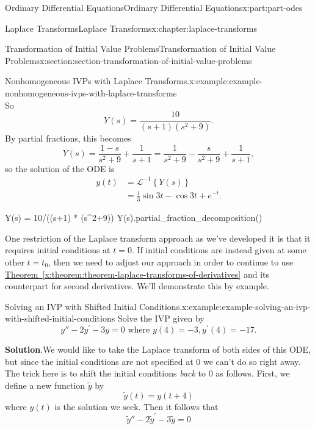 \documentclass[oneside,10pt,]{book}
\newcommand{\blocktitlefont}{\relax}
\newcommand{\xreffont}{\relax}
\numberwithin{equation}{part}
\newcommand{\iLaplace}[1]{\mathcal{L}^{-1}\left\{#1\right\}}
\newcommand{\amp}{&}
\begin{document}
\begin{partptx}{Ordinary Differential Equations}{}{Ordinary Differential Equations}{}{}{x:part:part-odes}
\begin{chapterptx}{Laplace Transforms}{}{Laplace Transforms}{}{}{x:chapter:laplace-transforms}
\begin{sectionptx}{Transformation of Initial Value Problems}{}{Transformation of Initial Value Problems}{}{}{x:section:section-transformation-of-initial-value-problems}
\begin{example}{Nonhomogeneous IVPs with Laplace Transforms.}{x:example:example-nonhomogeneous-ivps-with-laplace-transforms}
\begin{equation*}
\end{equation*}
So%
\begin{equation*}
Y(s) = \frac{10}{(s+1)(s^{2}+9)}.
\end{equation*}
By partial fractions, this becomes%
\begin{equation*}
Y(s) = \frac{1-s}{s^{2}+9} + \frac{1}{s+1} = \frac{1}{s^{2}+9} - \frac{s}{s^{2}+9} + \frac{1}{s+1},
\end{equation*}
so the solution of the ODE is%
\begin{align*}
y(t) \amp = \iLaplace{Y(s)}\\
\amp= \frac{1}{3}\sin3t -\cos3t + e^{-t}\text{.}
\end{align*}
%
\end{example}
\begin{sageinput}
Y(s) = 10/((s+1) * (s^2+9))
Y(s).partial_fraction_decomposition()
\end{sageinput}
One restriction of the Laplace transform approach as we've developed it is that it requires initial conditions at \(t=0\). If initial conditions are instead given at some other \(t=t_0\), then we need to adjust our approach in order to continue to use \hyperref[x:theorem:theorem-laplace-transforms-of-derivatives]{Theorem~{\xreffont\ref{x:theorem:theorem-laplace-transforms-of-derivatives}}} and its counterpart for second derivatives. We'll demonstrate this by example.%
\begin{example}{Solving an IVP with Shifted Initial Conditions.}{x:example:example-solving-an-ivp-with-shifted-initial-conditions}%
Solve the IVP given by%
\begin{equation*}
y'' - 2y^\prime - 3y = 0\text{ where }y(4) = -3, y^\prime(4) = -17.
\end{equation*}
%
\par\smallskip%
\noindent\textbf{\blocktitlefont Solution}.\hypertarget{g:solution:idp105548781411360}{}\quad{}We would like to take the Laplace transform of both sides of this ODE, but since the initial conditions are not specified at \(0\) we can't do so right away. The trick here is to shift the initial conditions \emph{back} to \(0\) as follows. First, we define a new function \(\widetilde{y}\) by%
\begin{equation*}
\widetilde{y}(t) = y(t+4)
\end{equation*}
where \(y(t)\) is the solution we seek. Then it follows that%
\begin{equation*}
\widetilde{y}'' - 2\widetilde{y}^\prime - 3\widetilde{y} = 0
\end{equation*}

\end{example}
\end{sectionptx}
\end{chapterptx}
\end{partptx}
\end{document}
